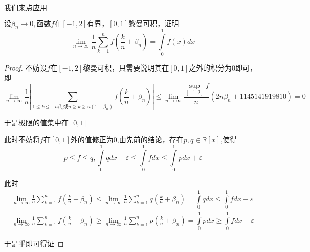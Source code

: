 \documentclass[lang=cn,10pt]{elegantbook}
\begin{document}
	我们来点应用
	\begin{exercise}
		$\text{设}\beta _n\rightarrow 0,\text{函数}f\text{在}\left[ -1,2 \right] \text{有界，}\left[ 0,1 \right] \text{黎曼可积，证明}$
		\begin{equation*}
			\lim_{n\rightarrow \infty} \frac{1}{n}\sum_{k=1}^n{f\left( \frac{k}{n}+\beta _n \right)}=\int\limits_0^1{f\left( x \right) dx}
		\end{equation*}
	\end{exercise}
	\begin{proof}
		
		不妨设$f$在$[-1,2]$黎曼可积，只需要说明其在$[0,1]$之外的积分为0即可，即
		\begin{equation*}
			\lim_{n\rightarrow \infty} \frac{1}{n}|\sum_{1\le k\le -n\beta _n\text{或}n\ge k\ge n\left( 1-\beta _n \right)}^{}{f\left( \frac{k}{n}+\beta _n \right)}|\le \lim_{n\rightarrow \infty} \frac{\mathop {\mathrm{sup}} \limits_{\left[ -1,2 \right]}f}{n}\left( 2n\beta _n+1145141919810 \right) =0
		\end{equation*}
		
		于是极限的值集中在$[0,1]$
		
		此时不妨将$f$在$[0,1]$外的值修正为$0$,由先前的结论，存在$p,q\in  \mathbb{R}[x]$,使得
		\begin{equation*}
			p\le f\le q,\int\limits_0^1{qdx}-\varepsilon \le \int\limits_0^1{fdx}\le \int\limits_0^1{pdx}+\varepsilon 
		\end{equation*}
		
		此时
		\begin{equation*}
			\begin{split}
			\lim_{n\rightarrow \infty} \frac{1}{n}\sum_{k=1}^n{f\left( \frac{k}{n}+\beta _n \right)}\le \lim_{n\rightarrow \infty} \frac{1}{n}\sum_{k=1}^n{q\left( \frac{k}{n}+\beta _n \right)}=\int\limits_0^1{q}dx\le \int\limits_0^1{f}dx+\varepsilon 
			\\
			\lim_{n\rightarrow \infty} \frac{1}{n}\sum_{k=1}^n{f\left( \frac{k}{n}+\beta _n \right)}\ge \lim_{n\rightarrow \infty} \frac{1}{n}\sum_{k=1}^n{p\left( \frac{k}{n}+\beta _n \right)}=\int\limits_0^1{p}dx\ge \int\limits_0^1{f}dx-\varepsilon 
			\end{split}
		\end{equation*}
		
		于是乎即可得证
	\end{proof}
	
\end{document}
